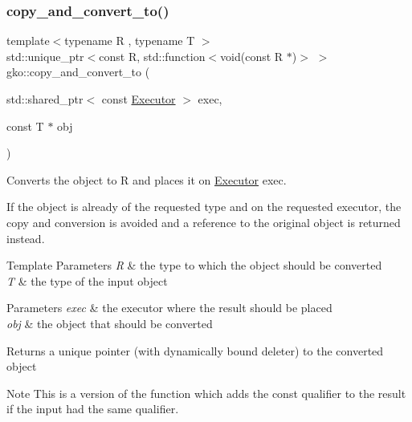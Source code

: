 \subsubsection{\texorpdfstring{copy\+\_\+and\+\_\+convert\+\_\+to()}{copy\_and\_convert\_to()}\hspace{0.1cm}{\footnotesize\ttfamily [2/2]}}
{\footnotesize\ttfamily template$<$typename R , typename T $>$ \\
std\+::unique\+\_\+ptr$<$const R, std\+::function$<$void(const R $\ast$)$>$ $>$ gko\+::copy\+\_\+and\+\_\+convert\+\_\+to (\begin{DoxyParamCaption}\item[{std\+::shared\+\_\+ptr$<$ const \hyperlink{classgko_1_1Executor}{Executor} $>$}]{exec,  }\item[{const T $\ast$}]{obj }\end{DoxyParamCaption})}



Converts the object to R and places it on \hyperlink{classgko_1_1Executor}{Executor} exec. 

If the object is already of the requested type and on the requested executor, the copy and conversion is avoided and a reference to the original object is returned instead.


\begin{DoxyTemplParams}{Template Parameters}
{\em R} & the type to which the object should be converted \\
\hline
{\em T} & the type of the input object\\
\hline
\end{DoxyTemplParams}

\begin{DoxyParams}{Parameters}
{\em exec} & the executor where the result should be placed \\
\hline
{\em obj} & the object that should be converted\\
\hline
\end{DoxyParams}
\begin{DoxyReturn}{Returns}
a unique pointer (with dynamically bound deleter) to the converted object
\end{DoxyReturn}
\begin{DoxyNote}{Note}
This is a version of the function which adds the const qualifier to the result if the input had the same qualifier. 
\end{DoxyNote}
\mbox{\label{namespacegko_a4eea40e4123a3fdb60fcd92f902c6d6d}} 
